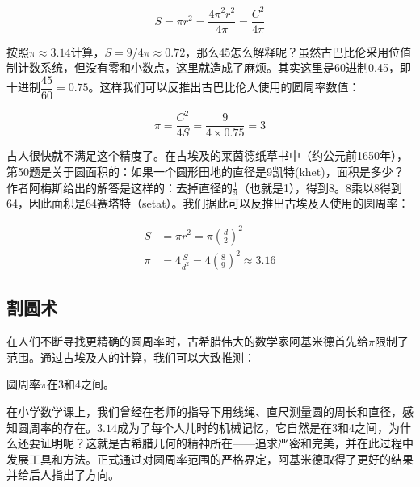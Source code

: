 \documentclass[b5paper]{ctexart}
\begin{document}
\[
S = \pi r^2 = \frac{4 \pi^2 r^2}{4\pi} = \frac{C^2}{4\pi}
\]

按照$\pi \approx 3.14$计算，$S = 9/4\pi \approx 0.72$，那么45怎么解释呢？虽然古巴比伦采用位值制计数系统，但没有零和小数点，这里就造成了麻烦。其实这里是60进制0.45，即十进制$\dfrac{45}{60} = 0.75$。这样我们可以反推出古巴比伦人使用的圆周率数值：

\[
\pi = \frac{C^2}{4S} = \frac{9}{4 \times 0.75} = 3
\]

古人很快就不满足这个精度了。在古埃及的莱茵德纸草书中（约公元前1650年），第50题是关于圆面积的：如果一个圆形田地的直径是9凯特(khet)，面积是多少？作者阿梅斯给出的解答是这样的：去掉直径的$\frac{1}{9}$（也就是1），得到8。8乘以8得到64，因此面积是64赛塔特（setat）。我们据此可以反推出古埃及人使用的圆周率：

\begin{align*}
S & = \pi r^2 = \pi (\frac{d}{2})^2 \\
\pi & = 4\frac{S}{d^2} = 4(\frac{8}{9})^2 \approx 3.16
\end{align*}

\subsection{割圆术}
在人们不断寻找更精确的圆周率时，古希腊伟大的数学家阿基米德首先给$\pi$限制了范围。通过古埃及人的计算，我们可以大致推测：

\begin{proposition}
圆周率$\pi$在3和4之间。
\end{proposition}

在小学数学课上，我们曾经在老师的指导下用线绳、直尺测量圆的周长和直径，感知圆周率的存在。$3.14$成为了每个人儿时的机械记忆，它自然是在3和4之间，为什么还要证明呢？这就是古希腊几何的精神所在——追求严密和完美，并在此过程中发展工具和方法。正式通过对圆周率范围的严格界定，阿基米德取得了更好的结果并给后人指出了方向。
\end{document}
